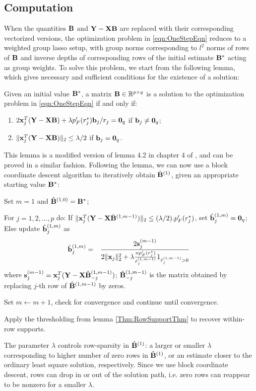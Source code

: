 \subsection{Computation}
When the quantities ${\mathbf{B}}$ and ${\mathbf{Y}} - {\mathbf{X}} {\mathbf{B}}$ are replaced with their corresponding vectorized versions, the optimization problem in \ref{eqn:OneStepEqn} reduces to a weighted group lasso \citep{YangZou15} setup, with group norms corresponding to $l^2$ norms of rows of ${\mathbf{B}}$ and inverse depths of corresponding rows of the initial estimate ${\mathbf{B}}^*$ acting as group weights. To solve this problem, we start from the following lemma, which gives necessary and sufficient conditions for the existence of a solution:
%
\begin{Lemma}
Given an initial value ${\mathbf{B}}^*$, a matrix ${\mathbf{B}} \in \mathbb R^{p \times q}$ is a solution to the optimization problem in \ref{eqn:OneStepEqn} if and only if:
%
\begin{enumerate}
\item $ 2 {\bf{x}}_j^T ({\mathbf{Y}} - {\mathbf{X}} {\mathbf{B}}) + \lambda p'_F (r_j^*) {\bf{b}}_j / r_j = {\bf 0}_q$ if ${\bf{b}}_j \neq {\bf 0}_q$;
\item $ \| {\bf{x}}_j^T ({\mathbf{Y}} - {\mathbf{X}} {\mathbf{B}}) \|_2 \leq \lambda/2 $ if ${\bf{b}}_j = {\bf 0}_q$.
\end{enumerate}
\end{Lemma}
%
This lemma is a modified version of lemma 4.2 in chapter 4 of \cite{BuhlmannBook}, and can be proved in a similar fashion. Following the lemma, we can now use a block coordinate descent algorithm \citep{LiNanZhu15} to iteratively obtain $\hat{{\mathbf{B}}}^{(1)}$, given an appropriate starting value ${\mathbf{B}}^*$:
%
\begin{outline}
\1 Set $m = 1$ and $\hat{{\mathbf{B}}}^{(1,0)} = {\mathbf{B}}^*$;

\1 For $j = 1, 2, ..., p$ do:
\2 If $\| {\bf{x}}_j^T ({\mathbf{Y}} - {\mathbf{X}} \hat{{\mathbf{B}}}^{(1,m-1)}) \|_2 \leq (\lambda/2). p'_F ( r_j^* ) $, set $\hat{{\bf{b}}}^{(1,m)}_j = {\bf 0}_q$;
\2 Else update $\hat{{\bf{b}}}^{(1,m)}_j$ as
%
\begin{eqnarray*}
\hat {{\bf{b}}}^{(1,m)}_j &=& \frac {2 {\bf{s}}^{(m-1)}_j} { 2 \| {\bf{x}}_j\|_2^2 + \lambda \frac{n p'_F (r_j^*)}{\hat r_j^{(1,m-1)}} 1 _{\hat r_j^{(1,m-1)} > 0}}
\end{eqnarray*}
%
where ${\bf{s}}^{(m-1)}_j = {\bf{x}}_j^T ( {\mathbf{Y}} - {\mathbf{X}}\hat{{\mathbf{B}}}^{(1,m-1)}_{-j})$; $\hat{{\mathbf{B}}}^{(1,m-1)}_{-j}$ is the matrix obtained by replacing $j$-th row of $\hat{{\mathbf{B}}}^{(1,m-1)}$ by zeros.

\1 Set $m \leftarrow m+1$, check for convergence and continue until convergence.

\1 Apply the thresholding from lemma \ref{Thm:RowSupportThm} to recover within-row supports.
\end{outline}
The parameter $\lambda$ controls row-sparsity in $\hat {{\mathbf{B}}}^{(1)}$: a larger or smaller $\lambda$ corresponding to higher number of zero rows in $\hat {{\mathbf{B}}}^{(1)}$, or an estimate closer to the ordinary least square solution, respectively. Since we use block coordinate descent, rows can drop in or out of the solution path, i.e. zero rows can reappear to be nonzero for a smaller $\lambda$.

